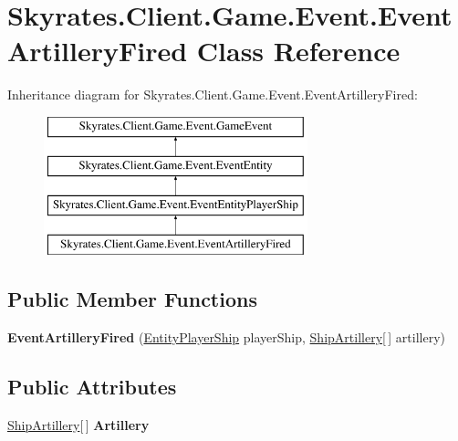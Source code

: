 \hypertarget{class_skyrates_1_1_client_1_1_game_1_1_event_1_1_event_artillery_fired}{\section{Skyrates.\-Client.\-Game.\-Event.\-Event\-Artillery\-Fired Class Reference}
\label{class_skyrates_1_1_client_1_1_game_1_1_event_1_1_event_artillery_fired}
}
Inheritance diagram for Skyrates.\-Client.\-Game.\-Event.\-Event\-Artillery\-Fired\-:\begin{figure}[H]
\begin{center}
\leavevmode
\includegraphics[height=4.000000cm]{class_skyrates_1_1_client_1_1_game_1_1_event_1_1_event_artillery_fired}
\end{center}
\end{figure}
\subsection*{Public Member Functions}
\begin{DoxyCompactItemize}
\item 
\hypertarget{class_skyrates_1_1_client_1_1_game_1_1_event_1_1_event_artillery_fired_a67f4bc8ed2243deae61eae52a2dc1f24}{{\bfseries Event\-Artillery\-Fired} (\hyperlink{class_skyrates_1_1_client_1_1_entity_player_ship}{Entity\-Player\-Ship} player\-Ship, \hyperlink{class_skyrates_1_1_client_1_1_ship_1_1_ship_artillery}{Ship\-Artillery}\mbox{[}$\,$\mbox{]} artillery)}\label{class_skyrates_1_1_client_1_1_game_1_1_event_1_1_event_artillery_fired_a67f4bc8ed2243deae61eae52a2dc1f24}

\end{DoxyCompactItemize}
\subsection*{Public Attributes}
\begin{DoxyCompactItemize}
\item 
\hypertarget{class_skyrates_1_1_client_1_1_game_1_1_event_1_1_event_artillery_fired_ad5f2f6d38c26018d0f6071554599b492}{\hyperlink{class_skyrates_1_1_client_1_1_ship_1_1_ship_artillery}{Ship\-Artillery}\mbox{[}$\,$\mbox{]} {\bfseries Artillery}}\label{class_skyrates_1_1_client_1_1_game_1_1_event_1_1_event_artillery_fired_ad5f2f6d38c26018d0f6071554599b492}

\end{DoxyCompactItemize}
